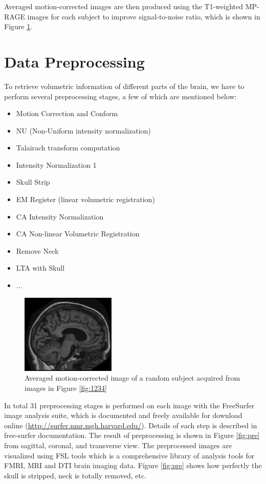 Averaged motion-corrected images are then produced using the T1-weighted MP-RAGE images for each subject to improve signal-to-noise ratio, which is shown in Figure \ref{fig:avg}.

\section{Data Preprocessing}

To retrieve volumetric information of different parts of the brain, we have to perform several preprocessing stages, a few of which are mentioned below:

\begin{itemize}
	\item Motion Correction and Conform
	\item NU (Non-Uniform intensity normalization)
	\item Talairach transform computation
	\item Intensity Normalization 1
	\item Skull Strip
	\item EM Register (linear volumetric registration)
	\item CA Intensity Normalization
	\item CA Non-linear Volumetric Registration
	\item Remove Neck
	\item LTA with Skull
	\item ...
\end{itemize}

\begin{figure}
	\centering
	\includegraphics[width=0.4\textwidth]{images/avg.png}
	\caption{Averaged motion-corrected image of a random subject acquired from images in Figure \ref{fig:1234}}
	\label{fig:avg}
\end{figure} 

In total 31 preprocessing stages is performed on each image with the FreeSurfer image analysis suite, which is documented and freely available for download online (\href{http://surfer.nmr.mgh.harvard.edu/}{http://surfer.nmr.mgh.harvard.edu/}). Details of each step is described in free-surfer documentation. The result of preprocessing is shown in Figure \ref{fig:pre} from sagittal, coronal, and transverse view. The preprocessed images are visualized using FSL tools which is a comprehensive library of analysis tools for FMRI, MRI and DTI brain imaging data. Figure \ref{fig:pre} shows how perfectly the skull is stripped, neck is totally removed, etc.

